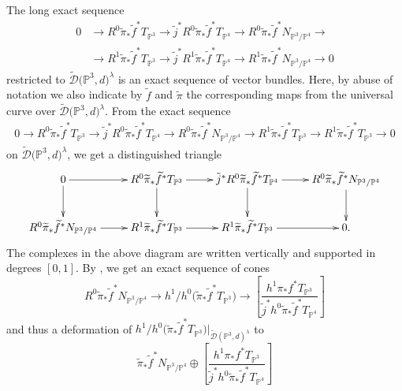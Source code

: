 \documentclass[pdftex]{sigma}
\numberwithin{equation}{section}
\newcommand{\PP}{\mathbb P}
\begin{document}
\begin{Remark}
The long exact sequence
\begin{align*}0& \to R^0\widetilde{\pi}_*\widetilde{f}^*T_{\PP^3}\to \tilde{j}^*R^0\widetilde{\pi}_*\widetilde{f}^*T_{\PP^4}\to R^0\widetilde{\pi}_*\widetilde{f}^*N_{\PP^3/\PP^4}\to \\
& \to R^1\widetilde{\pi}_*\widetilde{f}^*T_{\PP^3}\to \tilde{j}^* R^1\widetilde{\pi}_*\widetilde{f}^*T_{\PP^4}\to R^1\widetilde{\pi}_*\widetilde{f}^*N_{\PP^3/\PP^4}\to 0
\end{align*}
restricted to $\widetilde{\mathcal{D}}\big(\PP^3,d\big)^{\lambda}$ is an exact sequence of vector bundles. Here, by abuse of notation we also indicate by $\widetilde{f}$ and $\widetilde{\pi}$ the corresponding maps from the universal curve over $\widetilde{\mathcal{D}}\big(\PP^3,d\big)^{\lambda}$. From the exact sequence
\begin{align*}0\to R^0\widetilde{\pi}_*\widetilde{f}^*T_{\PP^3}\to \tilde{j}^*R^0\widetilde{\pi}_*\widetilde{f}^*T_{\PP^4}\to R^0\widetilde{\pi}_*\widetilde{f}^*N_{\PP^3/\PP^4}
\to R^1\widetilde{\pi}_*\widetilde{f}^*T_{\PP^3}\to R^1\widetilde{\pi}_*\widetilde{f}^*T_{\PP^3}\to 0
\end{align*}
on $\widetilde{\mathcal{D}}\big(\PP^3,d\big)^{\lambda}$, we get a distinguished triangle
\[ \begin{xymatrix}{0\ar[r]\ar[d]&
R^{0}\widetilde{\pi}_*\widetilde{f}^*T_{\PP^3}\ar[r]\ar[d]& \tilde{j}^*R^{0}\widetilde{\pi}_*\widetilde{f}^*T_{\PP^4}\ar[r]\ar[d]&R^{0}\widetilde{\pi}_*\widetilde{f}^*N_{\PP^3/\PP^4}\ar[d]\\
R^{0}\widetilde{\pi}_*\widetilde{f}^*N_{\PP^3/\PP^4}\ar[r]&R^{1}\widetilde{\pi}_*\widetilde{f}^*T_{\PP^3}\ar[r]&R^{1}\widetilde{\pi}_*\widetilde{f}^*T_{\PP^3}\ar[r]&0
.}
\end{xymatrix}
\]
The complexes in the above diagram are written vertically and supported in degrees $[0,1]$. By \cite[Proposition~2.7]{BerFan}, we get an exact sequence of cones
\[R^{0}\widetilde{\pi}_*\widetilde{f}^*N_{\PP^3/\PP^4}\to
h^1/h^0\big(\widetilde{\pi}_*\widetilde{f}^*T_{\PP^3}\big)\to \left[\frac{h^1\pi_*f^*T_{\PP^3}}{\tilde{j}^*h^0\widetilde{\pi}_*\widetilde{f}^*T_{\PP^4}}\right]
\]
and thus a deformation of $h^1/h^0\big(\widetilde{\pi}_*\widetilde{f}^*T_{\PP^3}\big)|_{\widetilde{\mathcal{D}}(\PP^3,d)^{\lambda}}$ to
\begin{equation}\label{limvbstack}\widetilde{\pi}_*\tilde{f}^*N_{\PP^3/\PP^4}\oplus \left[\frac{h^1\pi_*f^*T_{\PP^3}}{\tilde{j}^*h^0\widetilde{\pi}_*\widetilde{f}^*T_{\PP^4}}\right]
\end{equation}

\end{Remark}
\end{document}
